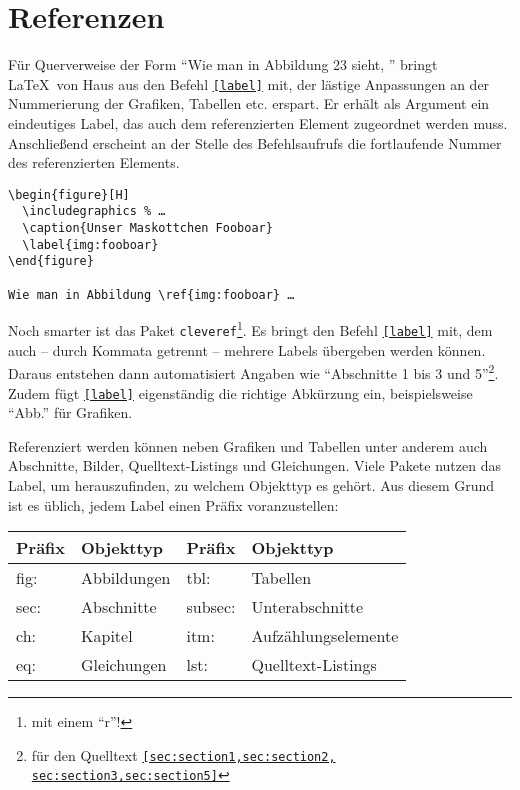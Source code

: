 \section{Referenzen}

Für Querverweise der Form \enquote{Wie man in Abbildung 23 sieht, \textellipsis} bringt \LaTeX\ von Haus aus den Befehl \texttt{\ref{label}} mit, der lästige Anpassungen an der Nummerierung der Grafiken, Tabellen etc. erspart.
Er erhält als Argument ein eindeutiges Label, das auch dem referenzierten Element zugeordnet werden muss.
Anschließend erscheint an der Stelle des Befehlsaufrufs die fortlaufende Nummer des referenzierten Elements.

\begin{verbatim}
\begin{figure}[H]
  \includegraphics % …
  \caption{Unser Maskottchen Fooboar}
  \label{img:fooboar}
\end{figure}

Wie man in Abbildung \ref{img:fooboar} …
\end{verbatim}


Noch smarter ist das Paket \texttt{cleveref}\footnote{mit einem \enquote{r}!}.
Es bringt den Befehl \texttt{\cref{label}} mit, dem auch -- durch Kommata getrennt -- mehrere Labels übergeben werden können.
Daraus entstehen dann automatisiert Angaben wie \enquote{Abschnitte 1 bis 3 und 5}\footnote{für den Quelltext \texttt{\cref{sec:section1,sec:section2,
sec:section3,sec:section5}}}.
Zudem fügt \texttt{\cref{label}} eigenständig die richtige Abkürzung ein, beispielsweise \enquote{Abb.} für Grafiken.

Referenziert werden können neben Grafiken und Tabellen unter anderem auch Abschnitte, Bilder, Quelltext-Listings und Gleichungen.
Viele Pakete nutzen das Label, um herauszufinden, zu welchem Objekttyp es gehört.
Aus diesem Grund ist es üblich, jedem Label einen Präfix voranzustellen:

\begin{table}[H]
  \centering
  \begin{tabular}{@{}llll@{}}
    \toprule
    Präfix & Objekttyp & Präfix & Objekttyp \\ \midrule
    fig: & Abbildungen & tbl:    & Tabellen            \\ 
    sec: & Abschnitte  & subsec: & Unterabschnitte     \\
    ch:  & Kapitel     & itm:    & Aufzählungselemente \\
    eq:  & Gleichungen & lst:    & Quelltext-Listings  \\ \bottomrule
  \end{tabular}
\end{table}

